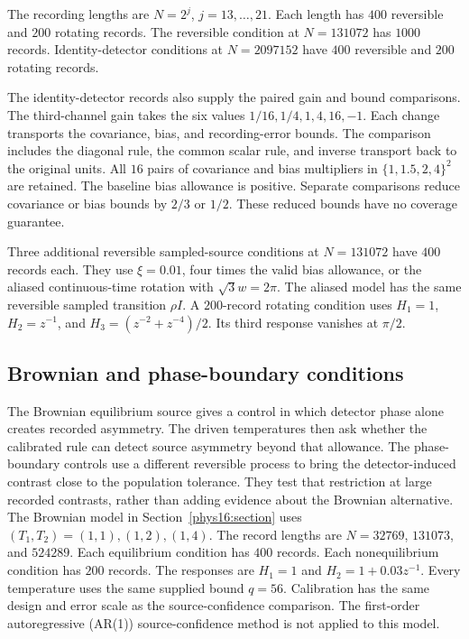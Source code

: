 The recording lengths are $N=2^j$, $j=13,\ldots,21$. Each length has $400$ reversible and $200$ rotating records. The reversible condition at $N=131072$ has $1000$ records. Identity-detector conditions at $N=2097152$ have $400$ reversible and $200$ rotating records.

The identity-detector records also supply the paired gain and bound comparisons. The third-channel gain takes the six values $1/16,1/4,1,4,16,-1$. Each change transports the covariance, bias, and recording-error bounds. The comparison includes the diagonal rule, the common scalar rule, and inverse transport back to the original units. All $16$ pairs of covariance and bias multipliers in $\{1,1.5,2,4\}^2$ are retained. The baseline bias allowance is positive. Separate comparisons reduce covariance or bias bounds by $2/3$ or $1/2$. These reduced bounds have no coverage guarantee.

Three additional reversible sampled-source conditions at $N=131072$ have $400$ records each. They use $\xi=0.01$, four times the valid bias allowance, or the aliased continuous-time rotation with $\sqrt3w=2\pi$. The aliased model has the same reversible sampled transition $\rho I$. A $200$-record rotating condition uses $H_1=1$, $H_2=z^{-1}$, and $H_3=(z^{-2}+z^{-4})/2$. Its third response vanishes at $\pi/2$.

\subsection{Brownian and phase-boundary conditions}
The Brownian equilibrium source gives a control in which detector phase alone creates recorded asymmetry. The driven temperatures then ask whether the calibrated rule can detect source asymmetry beyond that allowance. The phase-boundary controls use a different reversible process to bring the detector-induced contrast close to the population tolerance. They test that restriction at large recorded contrasts, rather than adding evidence about the Brownian alternative.
The Brownian model in Section~\ref{phys16:section} uses $(T_1,T_2)=(1,1),(1,2),(1,4)$. The record lengths are $N=32769$, $131073$, and $524289$. Each equilibrium condition has $400$ records. Each nonequilibrium condition has $200$ records. The responses are $H_1=1$ and $H_2=1+0.03z^{-1}$. Every temperature uses the same supplied bound $q=56$. Calibration has the same design and error scale as the source-confidence comparison. The first-order autoregressive (AR(1)) source-confidence method is not applied to this model.

